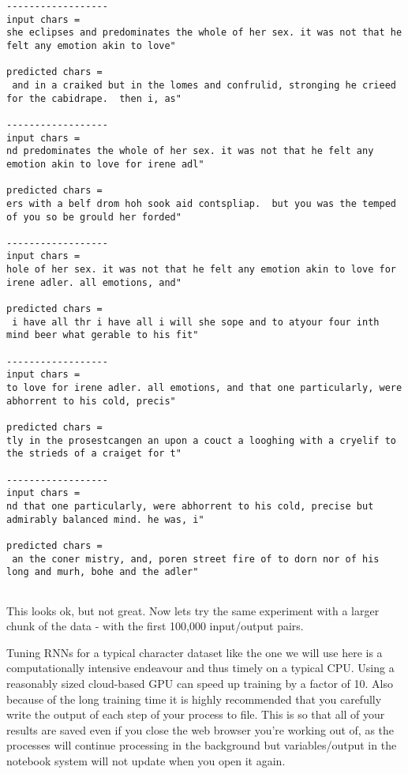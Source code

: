 \documentclass[11pt]{article}
\begin{document}
    \begin{Verbatim}[commandchars=\\\{\}]
------------------
input chars = 
she eclipses and predominates the whole of her sex. it was not that he felt any emotion akin to love"

predicted chars = 
 and in a craiked but in the lomes and confrulid, stronging he crieed for the cabidrape.  then i, as"

------------------
input chars = 
nd predominates the whole of her sex. it was not that he felt any emotion akin to love for irene adl"

predicted chars = 
ers with a belf drom hoh sook aid contspliap.  but you was the temped of you so be grould her forded"

------------------
input chars = 
hole of her sex. it was not that he felt any emotion akin to love for irene adler. all emotions, and"

predicted chars = 
 i have all thr i have all i will she sope and to atyour four inth mind beer what gerable to his fit"

------------------
input chars = 
to love for irene adler. all emotions, and that one particularly, were abhorrent to his cold, precis"

predicted chars = 
tly in the prosestcangen an upon a couct a looghing with a cryelif to the strieds of a craiget for t"

------------------
input chars = 
nd that one particularly, were abhorrent to his cold, precise but admirably balanced mind. he was, i"

predicted chars = 
 an the coner mistry, and, poren street fire of to dorn nor of his long and murh, bohe and the adler"


    \end{Verbatim}

    This looks ok, but not great. Now lets try the same experiment with a
larger chunk of the data - with the first 100,000 input/output pairs.

Tuning RNNs for a typical character dataset like the one we will use
here is a computationally intensive endeavour and thus timely on a
typical CPU. Using a reasonably sized cloud-based GPU can speed up
training by a factor of 10. Also because of the long training time it is
highly recommended that you carefully write the output of each step of
your process to file. This is so that all of your results are saved even
if you close the web browser you're working out of, as the processes
will continue processing in the background but variables/output in the
notebook system will not update when you open it again.
\end{document}
